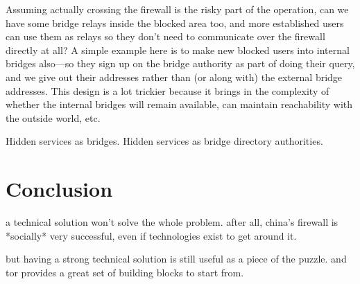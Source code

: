 \documentclass{llncs}
\begin{document}
Assuming actually crossing the firewall is the risky part of the
operation, can we have some bridge relays inside the blocked area too,
and more established users can use them as relays so they don't need to
communicate over the firewall directly at all? A simple example here is
to make new blocked users into internal bridges also---so they sign up
on the bridge authority as part of doing their query, and we give out
their addresses
rather than (or along with) the external bridge addresses. This design
is a lot trickier because it brings in the complexity of whether the
internal bridges will remain available, can maintain reachability with
the outside world, etc.

Hidden services as bridges. Hidden services as bridge directory authorities.

\section{Conclusion}

a technical solution won't solve the whole problem. after all, china's
firewall is *socially* very successful, even if technologies exist to
get around it.

but having a strong technical solution is still useful as a piece of the
puzzle. and tor provides a great set of building blocks to start from.

 


\end{document}
